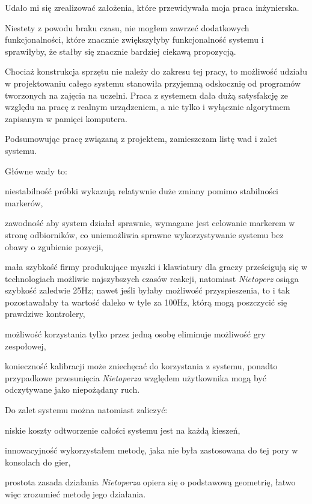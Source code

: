 \label{ch:conclusion}

Udało mi się zrealizować założenia, które przewidywała moja praca inżynierska.

Niestety z powodu braku czasu, nie mogłem zawrzeć dodatkowych funkcjonalności, które znacznie zwiększyłyby funkcjonalność systemu i sprawiłyby, że stałby się znacznie bardziej ciekawą propozycją.

Chociaż konstrukcja sprzętu nie należy do zakresu tej pracy, to możliwość udziału w projektowaniu całego systemu stanowiła przyjemną odskocznię od programów tworzonych na zajęcia na uczelni. Praca z systemem dała dużą satysfakcję ze względu na pracę z realnym urządzeniem, a nie tylko i wyłącznie algorytmem zapisanym w pamięci komputera.


Podsumowując pracę związaną z projektem, zamieszczam listę wad i zalet systemu.

Główne wady to:
\begin{aenumerate}
 \item niestabilność \ppauza próbki wykazują relatywnie duże zmiany pomimo stabilności markerów,
 \item zawodność \ppauza aby system działał sprawnie, wymagane jest celowanie markerem w stronę odbiorników, co uniemożliwia sprawne wykorzystywanie systemu bez obawy o zgubienie pozycji,
 \item mała szybkość \ppauza firmy produkujące myszki i klawiatury dla graczy prześcigują się w technologiach możliwie najszybszych czasów reakcji, natomiast \textsl{Nietoperz} osiąga szybkość zaledwie 25Hz; nawet jeśli byłaby możliwość przyspieszenia, to i tak pozostawałaby ta wartość daleko w tyle za 100Hz, którą mogą poszczycić się prawdziwe kontrolery,
 \item możliwość korzystania tylko przez jedną osobę \ppauza eliminuje możliwość gry zespołowej,
 \item konieczność kalibracji \ppauza może zniechęcać do korzystania z systemu, ponadto przypadkowe przesunięcia \textsl{Nietoperza} względem użytkownika mogą być odczytywane jako niepożądany ruch.
\end{aenumerate}

Do zalet systemu można natomiast zaliczyć:
\begin{aenumerate}
 \item niskie koszty \ppauza odtworzenie całości systemu jest na każdą kieszeń,
 \item innowacyjność \ppauza wykorzystałem metodę, jaka nie była zastosowana do tej pory w konsolach do gier,
 \item prostota \ppauza zasada działania \textsl{Nietoperza} opiera się o podstawową geometrię, łatwo więc zrozumieć metodę jego działania.
\end{aenumerate}

